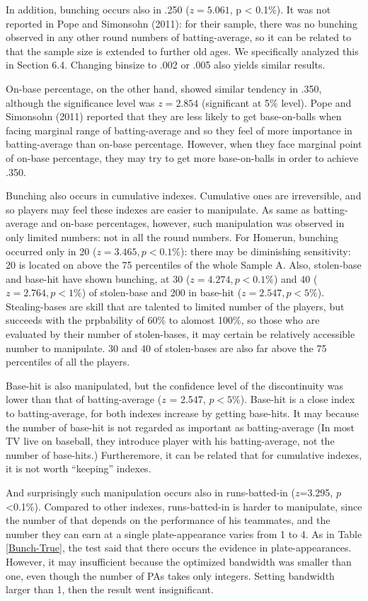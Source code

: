 \documentclass[dvipdfmx, 12pt]{article}
\begin{document}
In addition, bunching occurs also in .250 ($z = 5.061$, p < 0.1\%). It was not reported in Pope and Simonsohn (2011): for their sample, there was no bunching observed in any other round numbers of batting-average, so it can be related to that the sample size is extended to further old ages. We specifically analyzed this in Section 6.4. Changing binsize to .002 or .005 also yields similar results.

On-base percentage, on the other hand, showed similar tendency in .350, although the significance level was $z=2.854$ (significant at 5\% level). Pope and Simonsohn (2011) reported that they are less likely to get base-on-balls when facing marginal range of batting-average and so they feel of more importance in batting-average than on-base percentage. However, when they face marginal point of on-base percentage, they may try to get more base-on-balls in order to achieve .350.

Bunching also occurs in cumulative indexes. Cumulative ones are irreversible, and so players may feel these indexes are easier to manipulate. As same as batting-average and on-base percentages, however, such manipulation was observed in only limited numbers: not in all the round numbers. For Homerun, bunching occurred only in 20 ($z=3.465, p < 0.1\%$): there may be diminishing sensitivity: 20 is located on above the 75 percentiles of the whole Sample A. Also, stolen-base and base-hit have shown bunching, at 30 ($z=4.274, p < 0.1\%$) and 40 ($z=2.764, p < 1\%$) of stolen-base and 200 in base-hit ($z=2.547, p < 5\%$). Stealing-bases are skill that are talented to limited number of the players, but succeeds with the prpbability of 60\% to alomost 100\%, so those who are evaluated by their number of stolen-bases, it may certain be relatively accessible number to manipulate. 30 and 40 of stolen-bases are also far above the 75 percentiles of all the players.

Base-hit is also manipulated, but the confidence level of the discontinuity was lower than that of batting-average ($z$ = 2.547, $p < 5\%$). Base-hit is a close index to batting-average, for both indexes increase by getting base-hits. It may because the number of base-hit is not regarded as important as batting-average (In most TV live on baseball, they introduce player with his batting-average, not the number of base-hits.) Furtheremore, it can be related that for cumulative indexes, it is not worth ``keeping'' indexes.

And surprisingly such manipulation occurs also in runs-batted-in ($z$=3.295, $p$<0.1\%). Compared to other indexes, runs-batted-in is harder to manipulate, since the number of that depends on the performance of his teammates, and the number they can earn at a single plate-appearance varies from 1 to 4. As in Table \ref{Bunch-True}, the test said that there occurs the evidence in plate-appearances. However, it may insufficient because the optimized bandwidth was smaller than one, even though the number of PAs takes only integers. Setting bandwidth larger than 1, then the result went insignificant.
\end{document}
